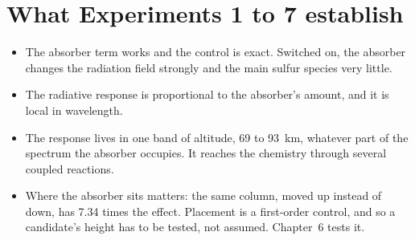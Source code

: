 \section{What Experiments 1 to 7 establish}
\label{sec:e17-summary}

\begin{itemize}
  \item The absorber term works and the control is exact. Switched on, the absorber
    changes the radiation field strongly and the main sulfur species very little.
  \item The radiative response is proportional to the absorber's amount, and it is
    local in wavelength.
  \item The response lives in one band of altitude, 69 to 93~km, whatever part of the
    spectrum the absorber occupies. It reaches the chemistry through several coupled
    reactions.
  \item Where the absorber sits matters: the same column, moved up instead of down,
    has 7.34 times the effect. Placement is a first-order control, and so a candidate's
    height has to be tested, not assumed. Chapter~6 tests it.
\end{itemize}
